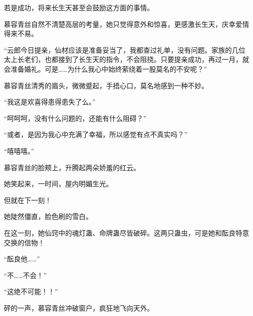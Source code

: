 \begin{this_body}
若是成功，将来长生天甚至会鼓励这方面的事情。

慕容青丝自然不清楚高层的考量，她只觉得意外和惊喜，更感激长生天，庆幸爱情得来不易。

“云郎今日提亲，仙材应该是准备妥当了，我都查过礼单，没有问题。家族的几位太上长老们，也都接到了长生天的指令，不会阻挠。只要提亲成功，再过一月，就会准备婚礼。可是……为什么我心中始终萦绕着一股莫名的不安呢？”

慕容青丝清秀的眉头，微微蹙起，手捂心口，莫名地感到一种不妙。

“我这是欢喜得患得患失了么。”

“呵呵呵，没有什么问题的，还能有什么阻碍？”

“或者，是因为我心中充满了幸福，所以感觉有点不真实吗？”

“嘻嘻嘻。”

慕容青丝的脸颊上，升腾起两朵娇羞的红云。

她笑起来，一时间，屋内明媚生光。

但就在下一刻！

她陡然僵直，脸色刷的雪白。

在这一刻，她仙窍中的魂灯蛊、命牌蛊尽皆破碎。这两只蛊虫，可是她和酝良特意交换的信物！

“酝良他……”

“不……不会！”

“这绝不可能！！”

砰的一声，慕容青丝冲破窗户，疯狂地飞向天外。

\end{this_body}

